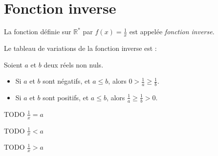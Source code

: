 \section{Fonction inverse}

\begin{definition}
  La fonction définie sur $\mathbb R^*$ par $f(x)=\frac{1}{x}$ est appelée \emph{fonction inverse}.
\end{definition}

\begin{propriete}[Variations]
  Le tableau de variations de la fonction inverse est :
  \begin{center}
    \hfill
  \end{center}
\end{propriete}

\begin{propriete}
  Soient $a$ et $b$ deux réels non nuls.
  \begin{itemize}
    \item Si $a$ et $b$ sont négatifs, et $a\leq b$, alors $0>\frac{1}{a}\geq\frac{1}{b}$.
    \item Si $a$ et $b$ sont positifs, et $a\leq b$, alors $\frac{1}{a}\geq\frac{1}{b}>0$.
  \end{itemize}
\end{propriete}

\begin{propriete}[Équation]
  TODO $\frac{1}{x}=a$
\end{propriete}

\begin{propriete}[Inéquation]
  TODO $\frac{1}{x}<a$

  TODO $\frac{1}{x}>a$
\end{propriete}

